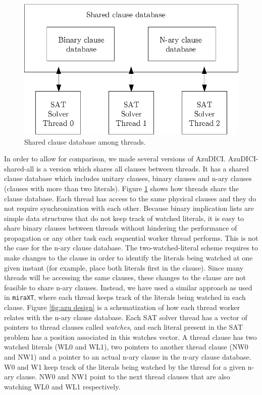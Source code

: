 \documentclass{llncs}
\begin{document}
\begin{figure}[tp]
  \centering
  \includegraphics[scale=0.7]{AzuDICI_database}
  \caption{Shared clause database among threads.}
  \label{fig:azu database}
\end{figure}

In order to allow for comparison, we made several versions of AzuDICI.
AzuDICI-shared-all is a version which shares all clauses between
threads. It has a shared clause database which includes unitary
clauses, binary clauses and n-ary clauses (clauses with more than
two literals). Figure \ref{fig:azu database}
shows how threads share the clause database. Each thread has access
to the same physical clauses and they do not require synchronization
with each other.
Because binary implication lists are simple data structures that do
not keep track of watched literals, it is easy to share binary clauses
between threads without hindering the performance of propagation
or any other task each sequential worker thread performs. This is not
the case for the n-ary clause database. The two-watched-literal
scheme requires to make changes to the clause in order to identify
the literals being watched at one given instant (for example, place
both literals first in the clause). Since many threads will be
accessing the same clauses, these changes to the clause are not
feasible to share n-ary clauses. Instead, we have used a similar 
approach as used in
{\tt miraXT}, where each thread keeps track of the literals being
watched in each clause. Figure \ref{fig:azu design} is a
schematization of how each thread worker relates with the n-ary
clause database. Each SAT solver thread has a vector of pointers
to thread clauses called \textit{watches}, and each literal present
in the SAT problem has a position associated in this watches vector.
A thread clause has two watched literals (WL0 and WL1), two
pointers to another thread clause (NW0 and NW1) and a pointer to
an actual n-ary clause in the n-ary clause database. W0 and W1 keep
track of the literals being watched by the thread for a given n-ary
clause. NW0 and NW1 point to the next thread clauses that are also 
watching WL0 and WL1 respectively.
\end{document}
